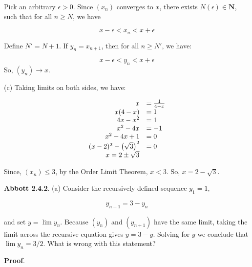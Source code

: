 \documentclass[10pt]{article}
\begin{document}
Pick an arbitrary $\displaystyle \epsilon  >0$. Since $\displaystyle ( x_{n})$ converges to $\displaystyle x$, there exists $\displaystyle N( \epsilon ) \in \mathbf{N}$, such that for all $\displaystyle n\geq N$, we have 


\begin{equation*}
x-\epsilon < x_{n} < x+\epsilon 
\end{equation*}


Define $\displaystyle N'=N+1$. If $\displaystyle y_{n} =x_{n+1}$, then for all $\displaystyle n\geq N'$, we have:


\begin{equation*}
x-\epsilon < y_{n} < x+\epsilon 
\end{equation*}
So, $\displaystyle ( y_{n})\rightarrow x$.



(c) Taking limits on both sides, we have:


\begin{equation*}
\begin{array}{ r l }
x & =\frac{1}{4-x}\\
x( 4-x) & =1\\
4x-x^{2} & =1\\
x^{2} -4x & =-1\\
x^{2} -4x+1 & =0\\
( x-2)^{2} -\left(\sqrt{3}\right)^{2} & =0\\
x=2\pm \sqrt{3} & 
\end{array}
\end{equation*}


Since, $\displaystyle ( x_{n}) \leq 3$, by the Order Limit Theorem, $\displaystyle x< 3$. So, $\displaystyle x=2-\sqrt{3}$.



\textbf{Abbott 2.4.2}. (a) Consider the recursively defined sequence $\displaystyle y_{1} =1$,




\begin{equation*}
y_{n+1} =3-y_{n}
\end{equation*}


and set $\displaystyle y=\lim y_{n}$. Because $\displaystyle ( y_{n})$ and $\displaystyle ( y_{n+1})$ have the same limit, taking the limit across the recursive equation gives $\displaystyle y=3-y$. Solving for $\displaystyle y$ we conclude that $\displaystyle \lim y_{n} =3/2$. What is wrong with this statement?



\textbf{Proof}.
\end{document}

